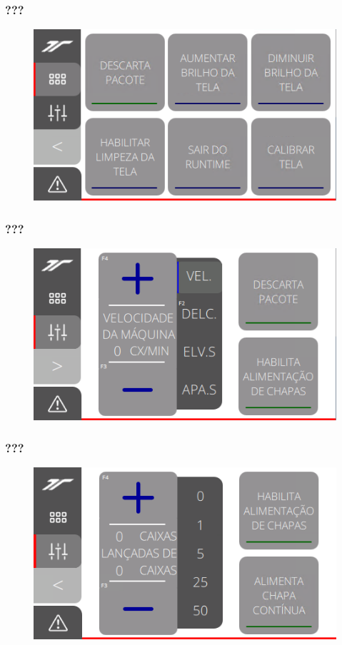 \subsubsection{\small{???}}
\begin{figure}[h]
  \centering
  \includegraphics{src/imagesFlexo/12-IHMCNT/e-3.png}
\end{figure}
\vspace*{\fill}

\newpage
\thispagestyle{fancy}
\vspace*{\fill}
\subsubsection{\small{???}}
\begin{figure}[h]
  \centering
  \includegraphics{src/imagesFlexo/12-IHMCNT/e-4.png}
\end{figure}
\vspace*{\fill}

\newpage
\thispagestyle{fancy}
\vspace*{\fill}
\subsubsection{\small{???}}
\begin{figure}[h]
  \centering
  \includegraphics{src/imagesFlexo/12-IHMCNT/e-5.png}
\end{figure}
\vspace*{\fill}


